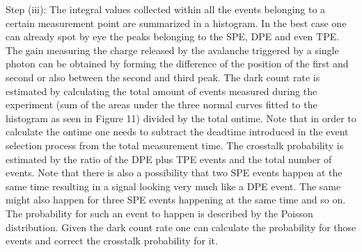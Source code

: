 \documentclass[10pt,a4paper]{article}
\begin{document}
\begin{multicols}{2}
Step (iii): The integral values collected within all the events belonging to a certain measurement point are summarized in a histogram. In the best case one can already spot by eye the peaks belonging to the SPE, DPE and even TPE. The gain measuring the charge released by the avalanche triggered by a single photon can be obtained by forming the difference of the position of the first and second or also between the second and third peak. The dark count rate is estimated by calculating the total amount of events measured during the experiment (sum of the areas under the three normal curves fitted to the histogram as seen in Figure 11) divided by the total ontime. Note that in order to calculate the ontime one needs to subtract the deadtime introduced in the event selection process from the total measurement time. The crosstalk probability is estimated by the ratio of the DPE plus TPE events and the total number of events. Note that there is also a possibility that two SPE events happen at the same time resulting in a signal looking very much like a DPE event. The same might also happen for three SPE events happening at the same time and so on. The probability for such an event to happen is described by the Poisson distribution. Given the dark count rate one can calculate the probability for those events and correct the crosstalk probability for it. 
\end{multicols}
\end{document}
